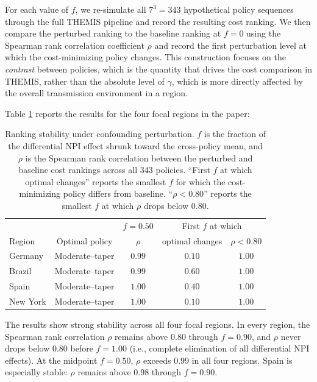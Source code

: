 \documentclass[letterpaper,twoside,11pt]{reviewresponse}
\begin{document}
\begin{enumerate}
For each value of $f$, we re-simulate all $7^3 = 343$ hypothetical policy sequences through the full THEMIS pipeline and record the resulting cost ranking. We then compare the perturbed ranking to the baseline ranking at $f=0$ using the Spearman rank correlation coefficient $\rho$ and record the first perturbation level at which the cost-minimizing policy changes. This construction focuses on the \emph{contrast} between policies, which is the quantity that drives the cost comparison in THEMIS, rather than the absolute level of $\gamma$, which is more directly affected by the overall transmission environment in a region.

Table \ref{tab:ranking_stability} reports the results for the four focal regions in the paper:
\begin{table}[h!]
	\centering
	\begin{tabular}{|l|c|c|c|c|}
		\hline
		& & $f=0.50$ & \multicolumn{2}{c|}{First $f$ at which} \\
		Region & Optimal policy & $\rho$ & optimal changes & $\rho < 0.80$ \\\hline
		Germany & Moderate--taper & $0.99$ & $0.10$ & $1.00$ \\
		Brazil  & Moderate--taper & $0.99$ & $0.60$ & $1.00$ \\
		Spain   & Moderate--taper & $1.00$ & $0.40$ & $1.00$ \\
		New York & Moderate--taper & $1.00$ & $0.10$ & $1.00$ \\\hline
	\end{tabular}
	\caption{Ranking stability under confounding perturbation. $f$ is the fraction of the differential NPI effect shrunk toward the cross-policy mean, and $\rho$ is the Spearman rank correlation between the perturbed and baseline cost rankings across all 343 policies. ``First $f$ at which optimal changes'' reports the smallest $f$ for which the cost-minimizing policy differs from baseline. ``$\rho < 0.80$'' reports the smallest $f$ at which $\rho$ drops below $0.80$.}
	\label{tab:ranking_stability}
\end{table}

The results show strong stability across all four focal regions. In every region, the Spearman rank correlation $\rho$ remains above $0.80$ through $f = 0.90$, and $\rho$ never drops below $0.80$ before $f = 1.00$ (i.e., complete elimination of all differential NPI effects). At the midpoint $f = 0.50$, $\rho$ exceeds $0.99$ in all four regions. Spain is especially stable: $\rho$ remains above $0.98$ through $f = 0.90$.


\end{enumerate}
\end{document}
